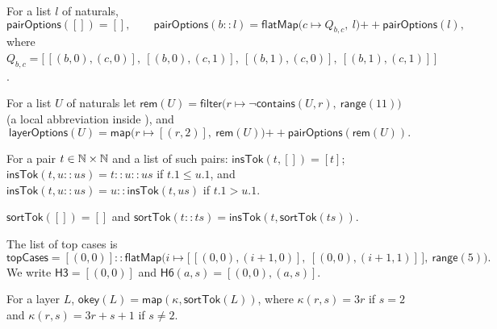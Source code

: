 \begin{definition}\label{cb:def:pairoptions}
For a list $l$ of naturals,
\[
\mathsf{pairOptions}([])=[],\qquad
\mathsf{pairOptions}(b\mathbin{::}l)=\mathsf{flatMap}\big(c\mapsto Q_{b,c},\ l\big)\mathbin{+\!\!+}\mathsf{pairOptions}(l),
\]
where $Q_{b,c}=\big[\,[(b,0),(c,0)],\ [(b,0),(c,1)],\ [(b,1),(c,0)],\ [(b,1),(c,1)]\,\big]$.
\end{definition}

\begin{definition}\label{cb:def:layeroptions}
For a list $U$ of naturals let $\mathsf{rem}(U)=\mathsf{filter}\big(r\mapsto\neg\mathsf{contains}(U,r),\
\mathsf{range}(11)\big)$ (a local abbreviation inside ), and
\[
\mathsf{layerOptions}(U)=\mathsf{map}\big(r\mapsto[(r,2)],\ \mathsf{rem}(U)\big)\mathbin{+\!\!+}
\mathsf{pairOptions}(\mathsf{rem}(U)).
\]
\end{definition}

\begin{definition}\label{cb:def:instok}
For a pair $t\in\mathbb N\times\mathbb N$ and a list of such pairs: $\mathsf{insTok}(t,[])=[t]$;
$\mathsf{insTok}(t,u\mathbin{::}us)=t\mathbin{::}u\mathbin{::}us$ if $t.1\le u.1$, and
$\mathsf{insTok}(t,u\mathbin{::}us)=u\mathbin{::}\mathsf{insTok}(t,us)$ if $t.1>u.1$.
\end{definition}

\begin{definition}\label{cb:def:sorttok}
$\mathsf{sortTok}([])=[]$ and $\mathsf{sortTok}(t\mathbin{::}ts)=\mathsf{insTok}(t,\mathsf{sortTok}(ts))$.
\end{definition}

\begin{definition}\label{cb:def:topcases}
The list of top cases is
\[
\mathsf{topCases}=[(0,0)]\mathbin{::}\mathsf{flatMap}\big(i\mapsto\big[\,[(0,0),(i+1,0)],\ [(0,0),(i+1,1)]\,\big],\
\mathsf{range}(5)\big).
\]
We write $\mathsf{H3}=[(0,0)]$ and $\mathsf{H6}(a,s)=[(0,0),(a,s)]$.
\end{definition}

\begin{definition}\label{cb:def:okey}
For a layer $L$, $\mathsf{okey}(L)=\mathsf{map}(\kappa,\mathsf{sortTok}(L))$, where $\kappa(r,s)=3r$ if $s=2$ and
$\kappa(r,s)=3r+s+1$ if $s\ne2$.
\end{definition}

